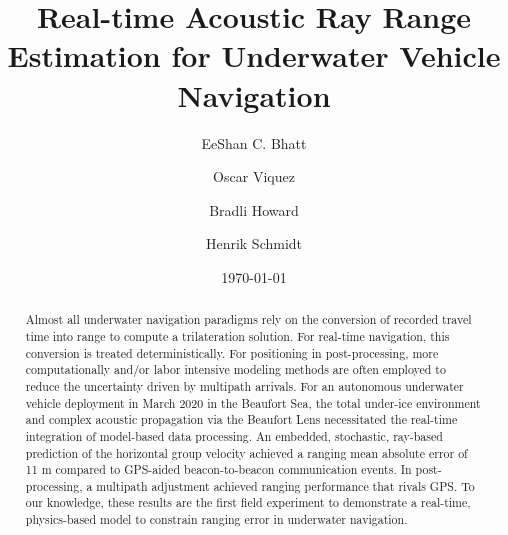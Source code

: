 \title[JASA/draft]{Real-time Acoustic Ray Range Estimation for Underwater Vehicle Navigation}
\author{EeShan C. Bhatt}
\author{Oscar Viquez}
\author{Bradli Howard}
\author{Henrik Schmidt}



\date{\today}

\begin{abstract}
Almost all underwater navigation paradigms rely on the conversion of recorded travel time into range to compute a trilateration solution. For real-time navigation, this conversion is treated deterministically. For positioning in post-processing, more computationally and/or labor intensive modeling methods are often employed to reduce the uncertainty driven by multipath arrivals. For an autonomous underwater vehicle deployment in March 2020 in the Beaufort Sea, the total under-ice environment and complex acoustic propagation via the Beaufort Lens necessitated the real-time integration of model-based data processing. An embedded, stochastic, ray-based prediction of the horizontal group velocity achieved a ranging mean absolute error of 11 m compared to GPS-aided beacon-to-beacon communication events. In post-processing, a multipath adjustment achieved ranging performance that rivals GPS. To our knowledge, these results are the first field experiment to demonstrate a real-time, physics-based model to constrain ranging error in underwater navigation.
\end{abstract}


